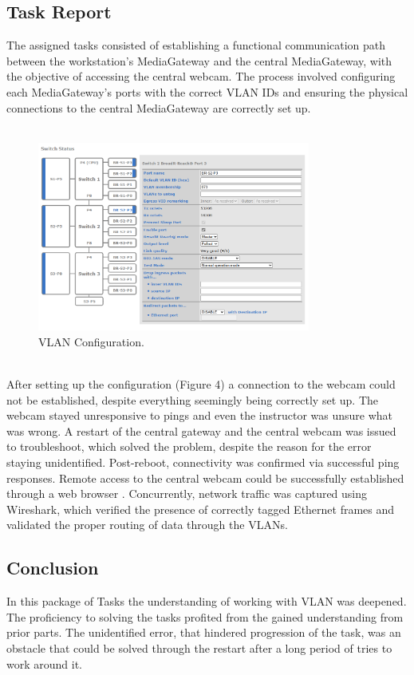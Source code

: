 \subsection{Task Report}
The assigned tasks consisted of establishing a functional communication path between the workstation’s MediaGateway and the central MediaGateway, with the objective of accessing the central webcam. The process involved configuring each MediaGateway’s ports with the correct VLAN IDs and ensuring the physical connections to the central MediaGateway are correctly set up. \\\\
\begin{figure}[h]
    \centering
     \includegraphics[width=0.8\textwidth]{figures/pictures/vlanconfig2.png}
    \caption{VLAN Configuration.}
    \label{fig:mediagateway_setup}
\end{figure}\\ After setting up the configuration (Figure 4) a connection to the webcam could not be established, despite everything seemingly being correctly set up. The webcam stayed unresponsive to pings and even the instructor was unsure what was wrong. A restart of the central gateway and the central webcam was issued to troubleshoot, which solved the problem, despite the reason for the error staying unidentified. Post-reboot, connectivity was confirmed via successful ping responses. Remote access to the central webcam could be successfully established through a web browser . Concurrently, network traffic was captured using Wireshark, which verified the presence of correctly tagged Ethernet frames and validated the proper routing of data through the VLANs. 

\subsection{Conclusion}
In this package of Tasks the understanding of working with VLAN was deepened. The proficiency to solving the tasks profited from the gained understanding from prior parts. The unidentified error, that hindered progression of the task, was an obstacle that could be solved through the restart after a long period of tries to work around it.

